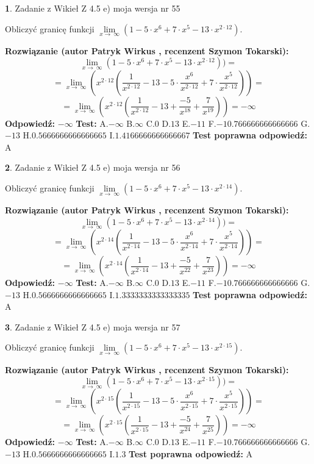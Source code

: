 \documentclass[12pt, a4paper]{article}
\theoremstyle{definition} %
\newtheorem{zad}{}
\newcommand{\zadStart}[1]{\begin{zad}#1\newline}
\newcommand{\zadStop}{\end{zad}}
\newcommand{\rozwStart}[2]{\noindent \textbf{Rozwiązanie (autor #1 , recenzent #2): }\newline}
\newcommand{\rozwStop}{\newline}
\newcommand{\odpStart}{\noindent \textbf{Odpowiedź:}\newline}
\newcommand{\odpStop}{\newline}
\newcommand{\testStart}{\noindent \textbf{Test:}\newline}
\newcommand{\testStop}{\newline}
\newcommand{\kluczStart}{\noindent \textbf{Test poprawna odpowiedź:}\newline}
\newcommand{\kluczStop}{\newline}
\begin{document}
\zadStart{Zadanie z Wikieł Z 4.5 e) moja wersja nr 55}


Obliczyć granicę funkcji  $\lim\limits_{x\to\ \infty}(1 - 5 \cdot x^{6}+7 \cdot x^{5}- 13 \cdot x^{2\cdot12})$.
\zadStop
\rozwStart{Patryk Wirkus}{Szymon Tokarski}
$$\lim\limits_{x\to\ \infty}(1 - 5 \cdot x^{6}+7 \cdot x^{5}- 13 \cdot x^{2\cdot12}))=$$
$$=\lim\limits_{x\to\ \infty}(x^{2\cdot12}(\frac{1}{x^{2\cdot12}}-13 -5 \cdot \frac{x^{6}}{x^{2\cdot12}}+7 \cdot \frac{x^{5}}{x^{2\cdot12}}))=$$
$$=\lim\limits_{x\to\ \infty}(x^{2\cdot12}(\frac{1}{x^{2\cdot12}}-13 + \frac{-5}{x^{18}}+ \frac{7}{x^{19}}))=-\infty$$
\rozwStop
\odpStart
$-\infty$
\odpStop
\testStart
A.$-\infty$ B.$\infty$ C.$0$ D.$13$ E.$-11$
F.$-10.766666666666666$ G.$-13$
H.$0.5666666666666665$
I.$1.4166666666666667$
\testStop
\kluczStart
A
\kluczStop



\zadStart{Zadanie z Wikieł Z 4.5 e) moja wersja nr 56}


Obliczyć granicę funkcji  $\lim\limits_{x\to\ \infty}(1 - 5 \cdot x^{6}+7 \cdot x^{5}- 13 \cdot x^{2\cdot14})$.
\zadStop
\rozwStart{Patryk Wirkus}{Szymon Tokarski}
$$\lim\limits_{x\to\ \infty}(1 - 5 \cdot x^{6}+7 \cdot x^{5}- 13 \cdot x^{2\cdot14}))=$$
$$=\lim\limits_{x\to\ \infty}(x^{2\cdot14}(\frac{1}{x^{2\cdot14}}-13 -5 \cdot \frac{x^{6}}{x^{2\cdot14}}+7 \cdot \frac{x^{5}}{x^{2\cdot14}}))=$$
$$=\lim\limits_{x\to\ \infty}(x^{2\cdot14}(\frac{1}{x^{2\cdot14}}-13 + \frac{-5}{x^{22}}+ \frac{7}{x^{23}}))=-\infty$$
\rozwStop
\odpStart
$-\infty$
\odpStop
\testStart
A.$-\infty$ B.$\infty$ C.$0$ D.$13$ E.$-11$
F.$-10.766666666666666$ G.$-13$
H.$0.5666666666666665$
I.$1.3333333333333335$
\testStop
\kluczStart
A
\kluczStop



\zadStart{Zadanie z Wikieł Z 4.5 e) moja wersja nr 57}


Obliczyć granicę funkcji  $\lim\limits_{x\to\ \infty}(1 - 5 \cdot x^{6}+7 \cdot x^{5}- 13 \cdot x^{2\cdot15})$.
\zadStop
\rozwStart{Patryk Wirkus}{Szymon Tokarski}
$$\lim\limits_{x\to\ \infty}(1 - 5 \cdot x^{6}+7 \cdot x^{5}- 13 \cdot x^{2\cdot15}))=$$
$$=\lim\limits_{x\to\ \infty}(x^{2\cdot15}(\frac{1}{x^{2\cdot15}}-13 -5 \cdot \frac{x^{6}}{x^{2\cdot15}}+7 \cdot \frac{x^{5}}{x^{2\cdot15}}))=$$
$$=\lim\limits_{x\to\ \infty}(x^{2\cdot15}(\frac{1}{x^{2\cdot15}}-13 + \frac{-5}{x^{24}}+ \frac{7}{x^{25}}))=-\infty$$
\rozwStop
\odpStart
$-\infty$
\odpStop
\testStart
A.$-\infty$ B.$\infty$ C.$0$ D.$13$ E.$-11$
F.$-10.766666666666666$ G.$-13$
H.$0.5666666666666665$
I.$1.3$
\testStop
\kluczStart
A
\kluczStop
\end{document}
